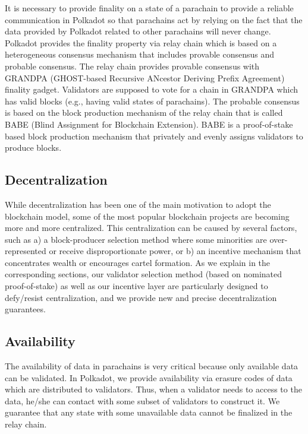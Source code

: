 
It is necessary to provide finality on a state of a parachain  to provide a reliable communication in Polkadot so that parachains act by relying on the fact that the data provided by Polkadot related to other parachains will never change. Polkadot provides the finality property via relay chain which is based on a heterogeneous consensus mechanism that includes provable consensus and probable consensus. The relay chain provides provable consensus with GRANDPA (GHOST-based Recursive ANcestor Deriving Prefix Agreement)  finality gadget. Validators are supposed to vote for a chain in GRANDPA  which has valid blocks (e.g., having valid states of parachains). The probable consensus is based on the block production mechanism of the relay chain that is called BABE (Blind Assignment for Blockchain Extension). BABE is a proof-of-stake based block production mechanism that privately and evenly assigns validators to produce blocks.

\subsection{Decentralization}

While decentralization has been one of the main motivation to adopt the blockchain model, some of the most popular blockchain projects are becoming more and more centralized.
This centralization can be caused by several factors, such as
a) a block-producer selection method where some minorities are over-represented or receive disproportionate power, or
b) an incentive mechanism that concentrates wealth or encourages cartel formation.
As we explain in the corresponding sections, our validator selection method (based on nominated proof-of-stake)
as well as our incentive layer are particularly designed to defy/resist  centralization,
and we provide new and precise decentralization guarantees.


\subsection{Availability}\label{sec:availability}
 The availability of data in parachains is very critical because only available data can be validated.  In Polkadot, we provide availability via erasure codes of data which are distributed to validators. Thus, when a validator needs to access to the data, he/she can contact with some subset of validators to construct it. We guarantee that any state with some unavailable data cannot be finalized in the relay chain.


